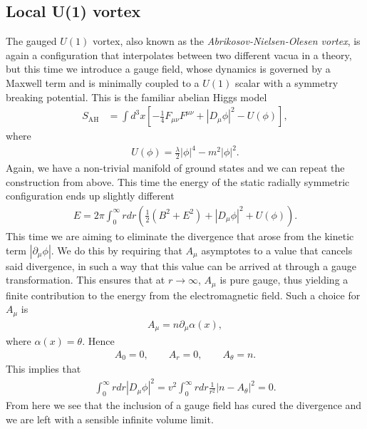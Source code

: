         \subsection{Local U(1) vortex}
        The gauged $U(1)$ vortex, also known as the \textit{Abrikosov-Nielsen-Olesen vortex}, is again a configuration that interpolates between two different vacua in a theory, but this time we introduce a gauge field, whose dynamics is governed by a Maxwell term and is minimally coupled to a $U(1)$ scalar with a symmetry breaking potential. This is the familiar abelian Higgs model
        \begin{align}
            S_{\text{AH}} & = \int d^3x \left[-\frac{1}{4} F_{\mu \nu} F^{\mu \nu} + | D_{\mu} \phi|^2 - U(\phi) \right], \label{eq:Abelian_Higgs_Model}
        \end{align}
        where
        \begin{align}
            U(\phi) = \frac{\lambda}{2} |\phi|^4 - m^2 |\phi|^2.
        \end{align}
    Again, we have a non-trivial manifold of ground states and we can repeat the construction from above. This time the energy of the static radially symmetric configuration ends up slightly different
    \begin{align}
        E = 2 \pi \int_0^{\infty} r dr \left(\frac{1}{2}( B^2 + E^2) + |D_{\mu} \phi|^2 + U(\phi) \right) .
    \end{align}
    This time we are aiming to eliminate the divergence that arose from the kinetic term $|\partial_{\mu}\phi|$. We do this by requiring that $A_{\mu}$ asymptotes to a value that cancels said divergence, in such a way that this value can be arrived at through a gauge transformation. This ensures that at $r\rightarrow \infty$, $A_{\mu}$ is pure gauge, thus yielding a finite contribution to the energy from the electromagnetic field. Such a choice for $A_{\mu}$ is
    \begin{align}
        A_{\mu} = n \partial_{\mu} \alpha(x),
    \end{align}
    where $\alpha(x) = \theta$. Hence
    \begin{align}
        A_0 =0, \qquad A_r =0, \qquad A_{\theta} = n.
    \end{align}
    This implies that
    \begin{align}
        \int_0^{\infty} r dr |D_{\mu}\phi|^2 = v^2\int_0^{\infty} r dr  \frac{1}{r^2}|n-A_{\theta}|^2 =0.
    \end{align}
    From here we see that the inclusion of a gauge field has cured the divergence and we are left with a sensible infinite volume limit. \\
